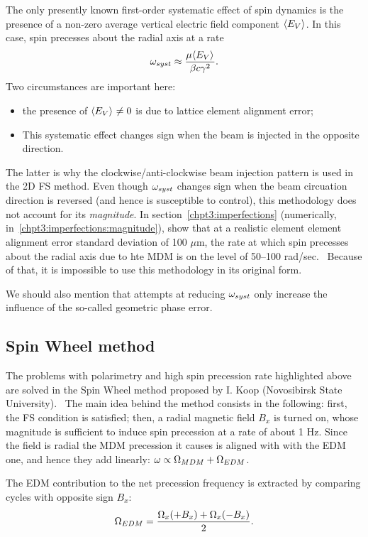 The only presently known first-order systematic effect of spin dynamics
is the presence of a non-zero average vertical electric field component $\avg{E_V}$.
In this case, spin precesses about the radial axis at a rate~\cite[p.~11]{BNL:Deuteron2008}
\[
\w_{syst} \approx \frac{\mu\avg{E_V}}{\beta c\gamma^2}.
\]
Two circumstances are important here:
\begin{itemize}
\item the presence of $\avg{E_V}\neq 0$ is due to lattice element alignment error;
\item This systematic effect changes sign when the beam is injected in the opposite direction.
\end{itemize}
The latter is why the clockwise/anti-clockwise beam injection pattern is used in the 2D FS method.
Even though $\omega_{syst}$ changes sign when the beam circuation direction is reversed (and hence is
susceptible to control), this methodology does not account for its \emph{magnitude}.
In section~\ref{chpt3:imperfections} (numerically, in~\ref{chpt3:imperfections:magnitude}), 
show that at a realistic element element alignment error standard deviation of 100 $\mu$m,
the rate at which spin precesses about the radial axis due to hte MDM is on the level of
50--100 rad/sec.~\cite{Senichev:FDM} Because of that, it is impossible to use this methodology
in its original form.

We should also mention that attempts at reducing $\omega_{syst}$ only increase the influence of the
so-called geometric phase error.~\cite[p.~6]{BNL:Proton}

\subsection{Spin Wheel method}
The problems with polarimetry and high spin precession rate highlighted above
are solved in the Spin Wheel method proposed by I. Koop
(Novosibirsk State University).~\cite{Koop:SpinWheel} The main idea behind the method
consists in the following: first, the FS condition is satisfied; then, a radial magnetic field
$B_x$ is turned on, whose magnitude is sufficient to induce spin precession at a rate of
about 1 Hz. Since the field is radial the MDM precession it causes is aligned with with the EDM
one, and hence they add linearly: $\omega \propto \Omega_{MDM} + \Omega_{EDM}$.

The EDM contribution to the net precession frequency is extracted by
comparing cycles with opposite sign $B_x$:~\cite[p.~1963]{Koop:SpinWheel}
\[
\Omega_{EDM} = \frac{\Omega_x(+B_x) + \Omega_x(-B_x)}{2}.
\]

